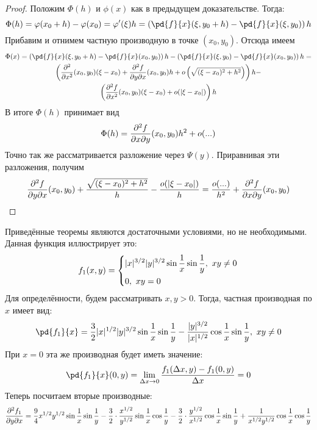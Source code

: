 \begin{proof}
	Положим $\Phi(h)$ и $\phi(x)$ как в предыдущем доказательстве. Тогда:
	\[
		\Phi(h) = \phi(x_0 + h) - \phi(x_0) = \phi'(\xi) h = \left(\pd{f}{x} (\xi, y_0 + h) - \pd{f}{x} (\xi, y_0)\right) h
	\]
	Прибавим и отнимем частную производную в точке $(x_0, y_0)$. Отсюда имеем
	\begin{multline*}
		\Phi(x) = \left(\pd{f}{x} (\xi, y_0 + h) - \pd{f}{x} (x_0, y_0)\right) h - \left(\pd{f}{x} (\xi, y_0) - \pd{f}{x} (x_0, y_0)\right) h =
		\\
		\left(\frac{\vdelta^2}{\vdelta x^2} (x_0, y_0) (\xi - x_0) + \frac{\vdelta^2 f}{\vdelta y \vdelta x} (x_0, y_0) h + o\left(\sqrt{(\xi - x_0)^2 + h^2}\right)\right) h -
		\\
		\left(\frac{\vdelta^2 f}{\vdelta x^2} (x_0, y_0) (\xi - x_0) + o(|\xi - x_0|)\right) h
	\end{multline*}
	В итоге $\Phi(h)$ принимает вид
	\[
		\Phi(h) = \frac{\partial^2 f}{\partial x \partial y} (x_0, y_0) h^2 + o(...)
	\]
	Точно так же рассматривается разложение через $\Psi(y)$. Приравнивая эти разложения, получим
	\[
		\frac{\partial^2 f}{\partial y \partial x} (x_0, y_0) + \frac{\sqrt{(\xi - x_0)^2 + h^2}}{h} - \frac{o(|\xi - x_0|)}{h} = \frac{o(...)}{h^2} + \frac{\partial^2 f}{\partial x \partial y} (x_0, y_0)
	\]
\end{proof}

\begin{example}
	Приведённые теоремы являются достаточными условиями, но не необходимыми. Данная функция иллюстрирует это:
	\[
		f_1(x, y) = \left\{\begin{aligned}
			&{|x|^{3/2} |y|^{3/2} \sin \frac{1}{x} \sin \frac{1}{y},\ xy \neq 0}
			\\
			&{0,\ xy = 0}
		\end{aligned}\right.
	\]
	Для определённости, будем рассматривать $x, y > 0$. Тогда, частная производная по $x$ имеет вид:
	\[
		\pd{f_1}{x} = \frac{3}{2} |x|^{1/2} |y|^{3/2} \sin \frac{1}{x} \sin \frac{1}{y} - \frac{|y|^{3/2}}{|x|^{1/2}} \cos \frac{1}{x} \sin \frac{1}{y},\ xy \neq 0
	\]
	При $x = 0$ эта же производная будет иметь значение:
	\[
		\pd{f_1}{x} (0, y) = \liml_{\Delta x \to 0} \frac{f_1(\Delta x, y) - f_1(0, y)}{\Delta x} = 0
	\]
	Теперь посчитаем вторые производные:
	\[
		\frac{\partial^2 f_1}{\partial y \partial x} = \frac{9}{4} x^{1/2} y^{1/2} \sin \frac{1}{x} \sin \frac{1}{y} - \frac{3}{2} \cdot \frac{x^{1/2}}{y^{1/2}} \sin \frac{1}{x} \cos \frac{1}{y} - \frac{3}{2} \cdot \frac{y^{1/2}}{x^{1/2}} \cos \frac{1}{x} \sin \frac{1}{y} + \frac{1}{x^{1/2} y^{1/2}} \cos \frac{1}{x} \cos \frac{1}{y} 
	\]
\end{example}

